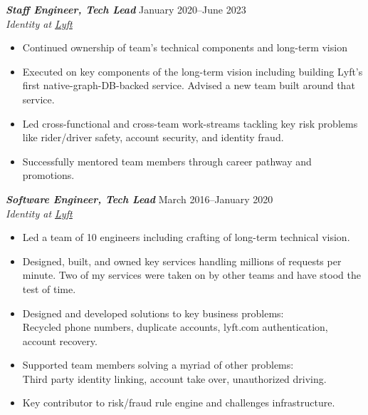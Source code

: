\documentclass[line,letterpaper]{resume}
\begin{document}
\begin{resume}
    {\sl\textbf{Staff Engineer, Tech Lead}} \hfill January 2020--June 2023\\
    \emph{Identity at \underline{\href{https://www.lyft.com/}{Lyft}}}
    \begin{itemize}
        \item Continued ownership of team's technical components and long-term
            vision
        \item Executed on key components of the long-term vision including
            building Lyft's first native-graph-DB-backed service. Advised a new
            team built around that service.
        \item Led cross-functional and cross-team work-streams tackling key
            risk problems like rider/driver safety, account security, and
            identity fraud.
        \item Successfully mentored team members through career pathway and
            promotions.
    \end{itemize}
    \vspace{6pt}

    {\sl\textbf{Software Engineer, Tech Lead}} \hfill March 2016--January 2020\\
    \emph{Identity at \underline{\href{https://www.lyft.com/}{Lyft}}}
    \begin{itemize}
        \item Led a team of 10 engineers including crafting of long-term
            technical vision.
        \item Designed, built, and owned key services handling millions of
            requests per minute. Two of my services were taken on by other teams
            and have stood the test of time.
        \item Designed and developed solutions to key business problems: \\
            Recycled phone numbers, duplicate accounts, lyft.com authentication,
            account recovery.
        \item Supported team members solving a myriad of other problems: \\
            Third party identity linking, account take over, unauthorized
            driving.
        \item Key contributor to risk/fraud rule engine and challenges
            infrastructure.
    \end{itemize}
    \vspace{6pt}


\end{resume}
\end{document}
